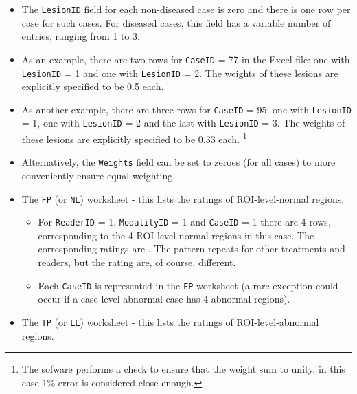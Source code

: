 \documentclass[]{book}
\providecommand{\tightlist}{%
  \setlength{\itemsep}{0pt}\setlength{\parskip}{0pt}}
\let\rmarkdownfootnote\footnote%
\def\footnote{\protect\rmarkdownfootnote}
\begin{document}
\begin{itemize}
 \texttt{CaseID} and 100 non-diseased cases (labeled 109-199). \footnote{The non-diseased cases numbered 128 - 199 are not shown above.}\\
\item
  The \texttt{LesionID} field for each non-diseased case is zero and there is one row per case for such cases. For diseased cases, this field has a variable number of entries, ranging from 1 to 3.
\item
  As an example, there are two rows for \texttt{CaseID} = 77 in the Excel file: one with \texttt{LesionID} = 1 and one with \texttt{LesionID} = 2. The weights of these lesions are explicitly specified to be 0.5 each.\\
\item
  As another example, there are three rows for \texttt{CaseID} = 95: one with \texttt{LesionID} = 1, one with \texttt{LesionID} = 2 and the last with \texttt{LesionID} = 3. The weights of these lesions are explicitly specified to be 0.33 each. \footnote{The sofware performs a check to ensure that the weight sum to unity, in this case 1\% error is considered close enough.}\\
\item
  Alternatively, the \texttt{Weights} field can be set to zeroes (for all cases) to more conveniently ensure equal weighting.
\item
  The \texttt{FP} (or \texttt{NL}) worksheet - this lists the ratings of ROI-level-normal regions.

  \begin{itemize}
  \tightlist
  \item
    For \texttt{ReaderID} = 1, \texttt{ModalityID} = 1 and \texttt{CaseID} = 1 there are 4 rows, corresponding to the 4 ROI-level-normal regions in this case. The corresponding ratings are . The pattern repeats for other treatments and readers, but the rating are, of course, different.\\
  \item
    Each \texttt{CaseID} is represented in the \texttt{FP} worksheet (a rare exception could occur if a case-level abnormal case has 4 abnormal regions).
  \end{itemize}
\item
  The \texttt{TP} (or \texttt{LL}) worksheet - this lists the ratings of ROI-level-abnormal regions.


\end{itemize}
\end{document}
